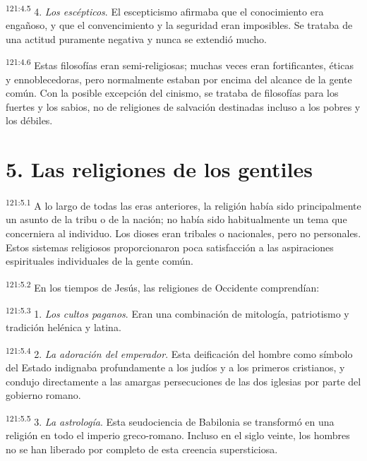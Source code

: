 \par 
\textsuperscript{121:4.5} 4. \textit{Los escépticos}. El escepticismo afirmaba que el conocimiento era engañoso, y que el convencimiento y la seguridad eran imposibles. Se trataba de una actitud puramente negativa y nunca se extendió mucho.

\par 
\textsuperscript{121:4.6} Estas filosofías eran semi-religiosas; muchas veces eran fortificantes, éticas y ennoblecedoras, pero normalmente estaban por encima del alcance de la gente común. Con la posible excepción del cinismo, se trataba de filosofías para los fuertes y los sabios, no de religiones de salvación destinadas incluso a los pobres y los débiles.

\section*{5. Las religiones de los gentiles}
\par 
\textsuperscript{121:5.1} A lo largo de todas las eras anteriores, la religión había sido principalmente un asunto de la tribu o de la nación; no había sido habitualmente un tema que concerniera al individuo. Los dioses eran tribales o nacionales, pero no personales. Estos sistemas religiosos proporcionaron poca satisfacción a las aspiraciones espirituales individuales de la gente común.

\par 
\textsuperscript{121:5.2} En los tiempos de Jesús, las religiones de Occidente comprendían:

\par 
\textsuperscript{121:5.3} 1. \textit{Los cultos paganos}. Eran una combinación de mitología, patriotismo y tradición helénica y latina.

\par 
\textsuperscript{121:5.4} 2. \textit{La adoración del emperador}. Esta deificación del hombre como símbolo del Estado indignaba profundamente a los judíos y a los primeros cristianos, y condujo directamente a las amargas persecuciones de las dos iglesias por parte del gobierno romano.

\par 
\textsuperscript{121:5.5} 3. \textit{La astrología}. Esta seudociencia de Babilonia se transformó en una religión en todo el imperio greco-romano. Incluso en el siglo veinte, los hombres no se han liberado por completo de esta creencia supersticiosa.

